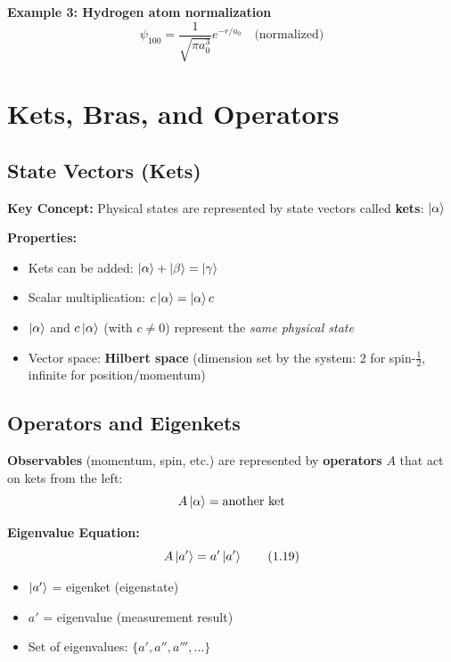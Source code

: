 \documentclass[11pt,a4paper]{article}
\begin{document}
\textbf{Example 3: Hydrogen atom normalization}
\begin{equation}
\psi_{100} = \frac{1}{\sqrt{\pi a_0^3}}e^{-r/a_0} \quad \text{(normalized)}
\tag{E.3}
\end{equation}
\newpage
\section{Kets, Bras, and Operators}

\subsection{State Vectors (Kets)}

\textbf{Key Concept:} Physical states are represented by state vectors called \textbf{kets}: $\ket{\alpha}$

\textbf{Properties:}
\begin{itemize}
\item Kets can be added: $\ket{\alpha} + \ket{\beta} = \ket{\gamma}$
\item Scalar multiplication: $c\ket{\alpha} = \ket{\alpha}c$
\item $\ket{\alpha}$ and $c\ket{\alpha}$ (with $c \neq 0$) represent the \textit{same physical state}
\item Vector space: \textbf{Hilbert space} (dimension set by the system: 2 for spin-$\frac{1}{2}$, infinite for position/momentum)
\end{itemize}

\subsection{Operators and Eigenkets}

\textbf{Observables} (momentum, spin, etc.) are represented by \textbf{operators} $A$ that act on kets from the left:
$$A\ket{\alpha} = \text{another ket}$$

\textbf{Eigenvalue Equation:}
\begin{equation}
A\ket{a'} = a'\ket{a'}
\tag{1.19}
\end{equation}

\begin{itemize}
\item $\ket{a'}$ = eigenket (eigenstate)
\item $a'$ = eigenvalue (measurement result)
\item Set of eigenvalues: $\{a', a'', a''', \ldots\}$
\end{itemize}
\end{document}
